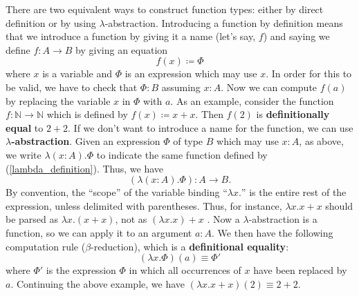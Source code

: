 There are two equivalent ways to construct function
types: either by direct definition or by using
$\lambda$-abstraction.
Introducing a function by definition means that
we introduce a function by giving it a name (let's say, $f$) and saying we define $f : A \to B$ by giving an equation
\begin{equation} \label{lambda_definition}
  f(x) \coloneqq \Phi
\end{equation}
where $x$ is a variable and $\Phi$ is an expression
which may use $x$. In order for this to be valid,
we have to check that $\Phi : B$ assuming $x : A$.
Now we can compute $f(a)$ by replacing the variable $x$ in $\Phi$ with $a$. As an example,
consider the function $f : \mathbb{N} \to \mathbb{N}$ which
is defined by $f(x) \coloneqq x + x$. Then $f(2)$ is \textbf{definitionally equal} to $2 + 2$.
If we don't want to introduce a name for the
function, we can use \textbf{$\lambda$-abstraction}.
Given an expression $\Phi$ of type $B$ which
may use $x : A$, as above, we write $\lambda(x : A). \Phi$ to
indicate the same function defined by
(\ref{lambda_definition}). Thus, we have
$$ (\lambda(x : A). \Phi) : A \to B. $$
By convention, the ``scope'' of the variable
binding ``$\lambda x.$''
is the entire rest of the expression,
unless delimited with parentheses.
Thus, for instance, $\lambda x. x + x$
should be parsed as $\lambda x.(x + x)$,
not as $(\lambda x. x) + x$ .
Now a $\lambda$-abstraction is a function,
so we can apply it to an argument $a : A$.
We then have the following computation
rule ($\beta$-reduction), which is a
\textbf{definitional equality}:
$$ (\lambda x. \Phi)(a) \equiv \Phi' $$
where $\Phi'$ is the expression $\Phi$ in
which all occurrences of $x$ have been
replaced by $a$.
Continuing the above example, we have
$(\lambda x. x + x)(2) \equiv 2 + 2. $
